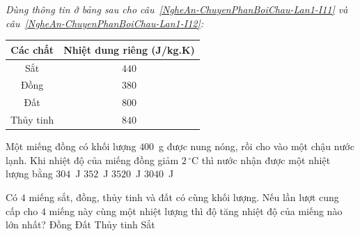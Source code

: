 	\begin{ex}%
		\label{NgheAn-ChuyenPhanBoiChau-Lan1-I11}\textit{Dùng thông tin ở bảng sau cho câu~\ref{NgheAn-ChuyenPhanBoiChau-Lan1-I11} và câu~\ref{NgheAn-ChuyenPhanBoiChau-Lan1-I12}:}
		\begin{center}
			{\renewcommand{\arraystretch}{1.15}\setlength{\tabcolsep}{12pt}%
			\begin{tabular}{|c|c|}
				\hline
				\textbf{Các chất} & \textbf{Nhiệt dung riêng (J/kg.K)}\\
				\hline
				Sắt & $440$\\
				\hline
				Đồng & $380$\\
				\hline
				Đất & $800$\\
				\hline
				Thủy tinh & $840$\\
				\hline
			\end{tabular}}
		\end{center}
		Một miếng đồng có khối lượng $400$~g được nung nóng, rồi cho vào một chậu nước lạnh. Khi nhiệt độ của miếng đồng giảm $2\,^\circ\text{C}$ thì nước nhận được một nhiệt lượng bằng
		\choice
		{\True $304$~J}
		{$352$~J}
		{$3520$~J}
		{$3040$~J}
	\end{ex}

	\begin{ex}%
		\label{NgheAn-ChuyenPhanBoiChau-Lan1-I12}Có $4$ miếng sắt, đồng, thủy tinh và đất có cùng khối lượng. Nếu lần lượt cung cấp cho $4$ miếng này cùng một nhiệt lượng thì độ tăng nhiệt độ của miếng nào lớn nhất?
		\choice
		{\True Đồng}
		{Đất}
		{Thủy tinh}
		{Sắt}
	\end{ex}

